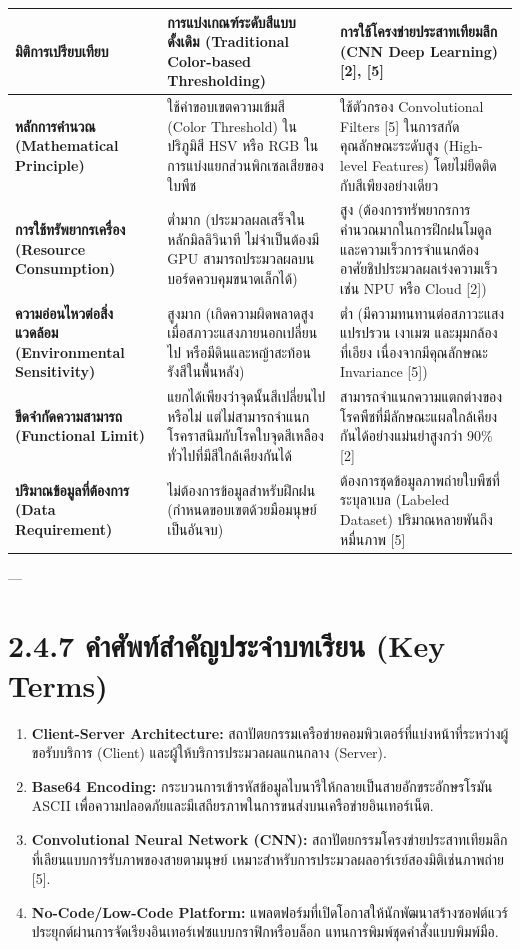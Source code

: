 \documentclass[11pt,a4paper,openany]{report}
\begin{document}
\begin{table}[htbp]
\centering
\begin{tabularx}{\textwidth}{L L L}
\toprule
มิติการเปรียบเทียบ & การแบ่งเกณฑ์ระดับสีแบบดั้งเดิม (Traditional Color-based Thresholding) & การใช้โครงข่ายประสาทเทียมลึก (CNN Deep Learning) [2], [5] \\
\midrule
\textbf{หลักการคำนวณ (Mathematical Principle)} & ใช้ค่าขอบเขตความเข้มสี (Color Threshold) ในปริภูมิสี HSV หรือ RGB ในการแบ่งแยกส่วนพิกเซลเสียของใบพืช & ใช้ตัวกรอง Convolutional Filters [5] ในการสกัดคุณลักษณะระดับสูง (High-level Features) โดยไม่ยึดติดกับสีเพียงอย่างเดียว \\
\textbf{การใช้ทรัพยากรเครื่อง (Resource Consumption)} & ต่ำมาก (ประมวลผลเสร็จในหลักมิลลิวินาที ไม่จำเป็นต้องมี GPU สามารถประมวลผลบนบอร์ดควบคุมขนาดเล็กได้) & สูง (ต้องการทรัพยากรการคำนวณมากในการฝึกฝนโมดูล และความเร็วการจำแนกต้องอาศัยชิปประมวลผลเร่งความเร็ว เช่น NPU หรือ Cloud [2]) \\
\textbf{ความอ่อนไหวต่อสิ่งแวดล้อม (Environmental Sensitivity)} & สูงมาก (เกิดความผิดพลาดสูงเมื่อสภาวะแสงภายนอกเปลี่ยนไป หรือมีดินและหญ้าสะท้อนรังสีในพื้นหลัง) & ต่ำ (มีความทนทานต่อสภาวะแสงแปรปรวน เงาเมฆ และมุมกล้องที่เอียง เนื่องจากมีคุณลักษณะ Invariance [5]) \\
\textbf{ขีดจำกัดความสามารถ (Functional Limit)} & แยกได้เพียงว่าจุดนั้นสีเปลี่ยนไปหรือไม่ แต่ไม่สามารถจำแนกโรคราสนิมกับโรคใบจุดสีเหลืองทั่วไปที่มีสีใกล้เคียงกันได้ & สามารถจำแนกความแตกต่างของโรคพืชที่มีลักษณะแผลใกล้เคียงกันได้อย่างแม่นยำสูงกว่า 90\% [2] \\
\textbf{ปริมาณข้อมูลที่ต้องการ (Data Requirement)} & ไม่ต้องการข้อมูลสำหรับฝึกฝน (กำหนดขอบเขตด้วยมือมนุษย์เป็นอันจบ) & ต้องการชุดข้อมูลภาพถ่ายใบพืชที่ระบุลาเบล (Labeled Dataset) ปริมาณหลายพันถึงหมื่นภาพ [5] \\
\bottomrule
\end{tabularx}
\end{table}


---

\section{2.4.7 คำศัพท์สำคัญประจำบทเรียน (Key Terms)}


\begin{enumerate}
  \item \textbf{Client-Server Architecture:} สถาปัตยกรรมเครือข่ายคอมพิวเตอร์ที่แบ่งหน้าที่ระหว่างผู้ขอรับบริการ (Client) และผู้ให้บริการประมวลผลแกนกลาง (Server).
  \item \textbf{Base64 Encoding:} กระบวนการเข้ารหัสข้อมูลไบนารีให้กลายเป็นสายอักขระอักษรโรมัน ASCII เพื่อความปลอดภัยและมีเสถียรภาพในการขนส่งบนเครือข่ายอินเทอร์เน็ต.
  \item \textbf{Convolutional Neural Network (CNN):} สถาปัตยกรรมโครงข่ายประสาทเทียมลึกที่เลียนแบบการรับภาพของสายตามนุษย์ เหมาะสำหรับการประมวลผลอาร์เรย์สองมิติเช่นภาพถ่าย [5].
  \item \textbf{No-Code/Low-Code Platform:} แพลตฟอร์มที่เปิดโอกาสให้นักพัฒนาสร้างซอฟต์แวร์ประยุกต์ผ่านการจัดเรียงอินเทอร์เฟซแบบกราฟิกหรือบล็อก แทนการพิมพ์ชุดคำสั่งแบบพิมพ์มือ.
\end{enumerate}
\end{document}
